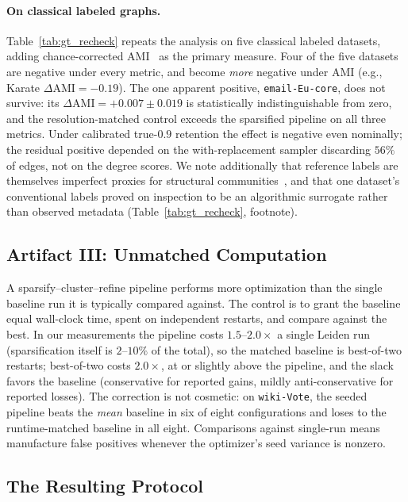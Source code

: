 \documentclass[10pt,journal,compsoc]{IEEEtran}
\begin{document}
\paragraph{On classical labeled graphs.}

Table~\ref{tab:gt_recheck} repeats the analysis on five classical labeled datasets, adding chance-corrected AMI~\cite{vinh2010information} as the primary measure.
Four of the five datasets are negative under every metric, and become \emph{more} negative under AMI (e.g., Karate $\Delta\mathrm{AMI} = -0.19$).
The one apparent positive, \texttt{email-Eu-core}, does not survive: its $\Delta\mathrm{AMI} = +0.007 \pm 0.019$ is statistically indistinguishable from zero, and the resolution-matched control exceeds the sparsified pipeline on all three metrics.
Under calibrated true-$0.9$ retention the effect is negative even nominally; the residual positive depended on the with-replacement sampler discarding $56\%$ of edges, not on the degree scores.
We note additionally that reference labels are themselves imperfect proxies for structural communities~\cite{peel2017ground, hric2014community}, and that one dataset's conventional labels proved on inspection to be an algorithmic surrogate rather than observed metadata (Table~\ref{tab:gt_recheck}, footnote).

\subsection{Artifact III: Unmatched Computation}
\label{sec:artifact-compute}

A sparsify--cluster--refine pipeline performs more optimization than the single baseline run it is typically compared against.
The control is to grant the baseline equal wall-clock time, spent on independent restarts, and compare against the best.
In our measurements the pipeline costs $1.5$--$2.0\times$ a single Leiden run (sparsification itself is $2$--$10\%$ of the total), so the matched baseline is best-of-two restarts; best-of-two costs $2.0\times$, at or slightly above the pipeline, and the slack favors the baseline (conservative for reported gains, mildly anti-conservative for reported losses).
The correction is not cosmetic: on \texttt{wiki-Vote}, the seeded pipeline beats the \emph{mean} baseline in six of eight configurations and loses to the runtime-matched baseline in all eight.
Comparisons against single-run means manufacture false positives whenever the optimizer's seed variance is nonzero.

\subsection{The Resulting Protocol}
\label{sec:protocol}
\end{document}
